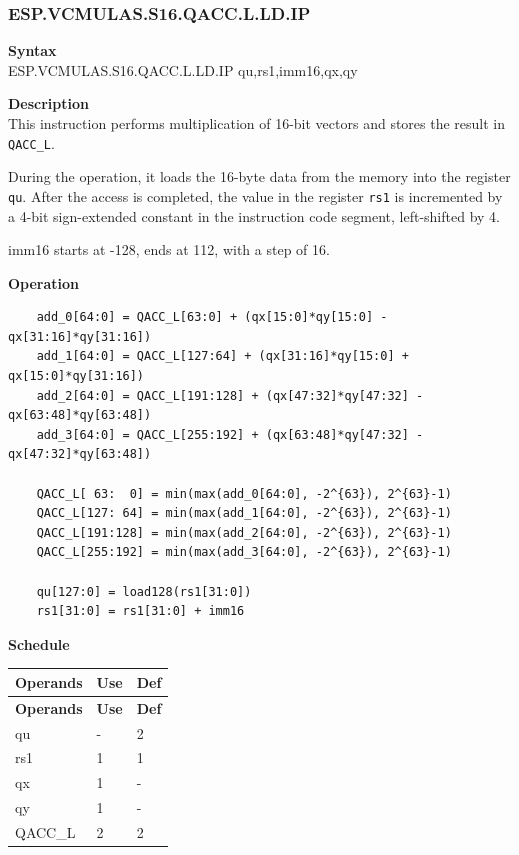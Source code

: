 \newpage
\subsubsection{ESP.VCMULAS.S16.QACC.L.LD.IP}\label{instruction:ESPVCMULASS16QACC_LLDIP}
\textbf{Syntax}\\
ESP.VCMULAS.S16.QACC.L.LD.IP qu,rs1,imm16,qx,qy

\textbf{Description}\\
This instruction performs multiplication of 16-bit vectors and stores the result in \lstinline{QACC_L}.

During the operation, it loads the 16-byte data from the memory into the register \lstinline{qu}. After the access is completed, the value in the register \lstinline{rs1} is incremented by a 4-bit sign-extended constant in the instruction code segment, left-shifted by 4.

imm16 starts at -128, ends at 112, with a step of 16.

\textbf{Operation}\\
\begin{lstlisting}
    add_0[64:0] = QACC_L[63:0] + (qx[15:0]*qy[15:0] - qx[31:16]*qy[31:16])
    add_1[64:0] = QACC_L[127:64] + (qx[31:16]*qy[15:0] + qx[15:0]*qy[31:16])
    add_2[64:0] = QACC_L[191:128] + (qx[47:32]*qy[47:32] - qx[63:48]*qy[63:48])
    add_3[64:0] = QACC_L[255:192] + (qx[63:48]*qy[47:32] - qx[47:32]*qy[63:48])

    QACC_L[ 63:  0] = min(max(add_0[64:0], -2^{63}), 2^{63}-1)
    QACC_L[127: 64] = min(max(add_1[64:0], -2^{63}), 2^{63}-1)
    QACC_L[191:128] = min(max(add_2[64:0], -2^{63}), 2^{63}-1)
    QACC_L[255:192] = min(max(add_3[64:0], -2^{63}), 2^{63}-1)

    qu[127:0] = load128(rs1[31:0])
    rs1[31:0] = rs1[31:0] + imm16
\end{lstlisting}

\textbf{Schedule}\\
\begin{longtable}[c]{|l|l|l|}
    \hline
    \rowcolor{lightgray}
    \textbf{Operands} & \textbf{Use} & \textbf{Def} \\\hline
    \endfirsthead
    \hline
    \rowcolor{lightgray}
     \textbf{Operands} & \textbf{Use} & \textbf{Def} \\\hline
    \endhead
    \hline
    \endfoot

    qu & - & 2 \\\hline
    rs1 & 1 & 1 \\\hline
     qx & 1 & - \\\hline
     qy & 1 & - \\\hline
     QACC\_L & 2 & 2

\end{longtable}

